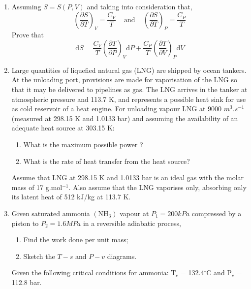 \documentclass[12pts,a4paper,amsmath,amssymb,floatfix]{article}%
\renewcommand{\d}{\mathrm{d}}
\newcommand{\frc}{\displaystyle\frac}
\begin{document}
\begin{enumerate}[label=\bfseries Problem \arabic*:]
\item\label{Tut02:Demonstration}Assuming $S = S\left(P,V\right)$ and taking into consideration that,
\begin{displaymath}
\left(\frc{\partial S}{\partial T}\right)_{V} = \frc{C_{V}}{T}\;\;\;\text{ and }\;\;\; \left(\frc{\partial S}{\partial T}\right)_{P} = \frc{C_{P}}{T}
\end{displaymath}
Prove that 
\begin{displaymath}
\d S = \frc{C_{V}}{T}\left(\frc{\partial T}{\partial P}\right)_{V}\d P + \frc{C_{P}}{T}\left(\frc{\partial T}{\partial V}\right)_{P}\d V
\end{displaymath}


\item\label{Tut02:LNG} Large quantities of liquefied natural gas (LNG) are shipped by ocean tankers. At the unloading port, provisions are made for vaporisation of the LNG so that it may be delivered to pipelines as gas. The LNG arrives in the tanker at atmospheric pressure and 113.7 K, and represents a possible heat sink for use as cold reservoir of a heat engine. For unloading vapour LNG at 9000 $m^{3}.s^{-1}$ (measured at 298.15 K and 1.0133 bar) and assuming the availability of an adequate heat source at 303.15 K:
\begin{enumerate}
\item What is the maximum possible power ?
\item What is the rate of heat transfer from the heat source? 
\end{enumerate}
Assume that LNG at 298.15 K and 1.0133 bar is an ideal gas with the molar mass of 17 g.mol$^{-1}$. Also assume that the LNG vaporises only, absorbing only its latent heat of 512 kJ/kg at 113.7 K.

\item Given saturated ammonia $\left(\text{NH}_{3}\right)$ vapour at $P_{1} = 200 kPa$ compressed by a piston to $P_{2} = 1.6 MPa$ in a reversible adiabatic process,
\begin{enumerate}
\item Find the work done per unit mass; 
\item Sketch the $T-s$ and $P-v$ diagrams.
\end{enumerate}
Given the following critical conditions for ammonia: T$_{c}$ = 132.4$^{\circ}$C and P$_{c}$ = 112.8 bar.



\end{enumerate}
\end{document}
